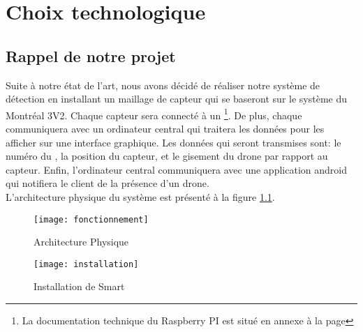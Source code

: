 
\chapter{Choix technologique}
\label{chap:choix}

\section{Rappel de notre projet}

Suite à notre état de l'art, nous avons décidé de réaliser notre système de détection en installant un maillage de capteur qui se baseront sur le système du Montréal 3V2. Chaque capteur sera connecté à un  \footnote{La documentation technique du Raspberry PI est situé en annexe à la page \pageref{annexe:rpi}}. De plus, chaque \rpi communiquera avec un ordinateur central qui traitera les données pour les afficher sur une interface graphique. Les données qui seront transmises sont: le numéro du \rpi, la position du capteur, et le gisement du drone par rapport au capteur. Enfin, l'ordinateur central communiquera avec une application android qui notifiera le client de la présence d'un drone.
~\\

L'architecture physique du système est présenté à la figure \ref{fig:arch_phys}.

\begin{figure}[!h]
  \centering
  \texttt{[image: fonctionnement]}
  \caption{Architecture Physique}
  \label{fig:arch_phys}
\end{figure}


\begin{figure}[!h]
  \centering
  \texttt{[image: installation]}
  \caption{Installation de Smart}
  \label{fig:inst}
\end{figure}



